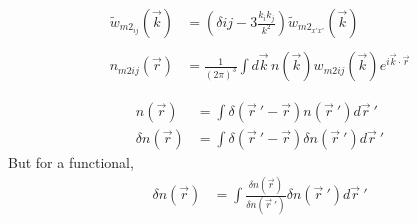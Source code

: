 \documentclass[double,12pt]{revtex4-2}
\begin{document}
\begin{align}
    \widetilde{w}_{m2_{ij}}(\vec{k}) &= (\delta{ij}-3\frac{k_ik_j}{k^2})
                                    \widetilde{w}_{{m2}_{x'x'}}(\vec{k}) \\ \nonumber \\
    n_{m2ij}(\vec r) &=  \frac{1}{\left(2\pi\right)^3}\int d\vec k\, 
                       n(\vec k) w_{m2ij}(\vec k)e^{i\vec k\cdot \vec r}
\end{align} 

\begin{align} 
  n(\vec r) &= \int \delta (\vec r~'-\vec r)n(\vec r~') d\vec r~'\\
  \delta n(\vec r) &= \int \delta (\vec r~'-\vec r)\delta n(\vec r~')
  d\vec r~'
\end{align} 
But for a functional,
\begin{align} 
\delta n(\vec r) &= \int \frac{\delta n(\vec r)}{\delta n(\vec r~')}
\delta n(\vec r~')d\vec r~'
\end{align} 
\end{document}
